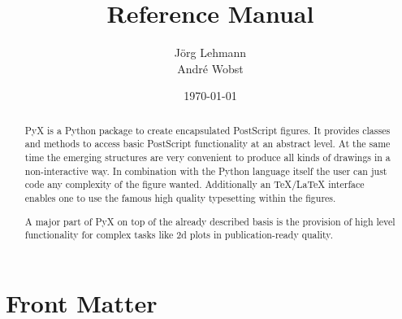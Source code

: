 \documentclass{manual}
\title{\PyX{} Reference Manual}
\author{J\"org Lehmann\\
Andr\'e Wobst}
\date{\today}
\def\PyX{PyX}
\begin{document}
\maketitle

\ifhtml %
\chapter*{Front Matter\label{front}}
\fi
\begin{abstract}
\noindent
\PyX{} is a Python package to create encapsulated PostScript figures. It
provides classes and methods to access basic PostScript functionality
at an abstract level. At the same time the emerging structures are
very convenient to produce all kinds of drawings in a non-interactive
way. In combination with the Python language itself the user can just
code any complexity of the figure wanted. Additionally an
\TeX{}/\LaTeX{} interface enables one to use the famous high quality
typesetting within the figures.

A major part of \PyX{} on top of the already described basis is the
provision of high level functionality for complex tasks like 2d plots
in publication-ready quality.
\end{abstract}

\tableofcontents














\appendix







\end{document}

